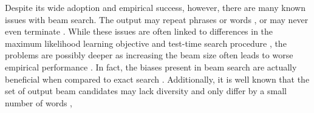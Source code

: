 Despite its wide adoption and empirical success, however, 
there are many known issues with beam search.
The output may repeat phrases or words \citep{soemthig}, or may never even terminate \citep{welleck2020consistency}.
While these issues are often linked to differences in the maximum likelihood learning objective
and test-time search procedure \citep{lafferty2001,andor2016}, the problems are possibly deeper as 
increasing the beam size often leads to worse empirical performance \citep{koehn2017}. In fact, the biases present in beam search are actually beneficial when compared to exact search \citep{stahlberg2019}.
Additionally, it is well known that the set of output
beam candidates may lack diversity and only differ by a small number of words \citep{sordoni2015,galley2015,li2016,vinyals2015,serban2016},


